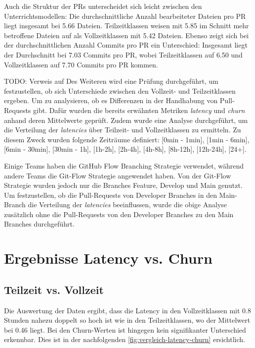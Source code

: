 Auch die Struktur der PRs unterscheidet sich leicht zwischen den Unterrichtsmodellen: Die durchschnittliche Anzahl bearbeiteter Dateien pro PR liegt insgesamt bei 5.66 Dateien. Teilzeitklassen weisen mit 5.85 im Schnitt mehr betroffene Dateien auf als Vollzeitklassen mit 5.42 Dateien. Ebenso zeigt sich bei der durchschnittlichen Anzahl Commits pro PR ein Unterschied: Insgesamt liegt der Durchschnitt bei 7.03 Commits pro PR, wobei Teilzeitklassen auf 6.50 und Vollzeitklassen auf 7.70 Commits pro PR kommen.

TODO: Verweis auf 
Des Weiteren wird eine Prüfung durchgeführt, um festzustellen, ob sich Unterschiede zwischen den Vollzeit- und Teilzeitklassen ergeben. Um zu analysieren, ob es Differenzen in der Handhabung von Pull-Requests gibt. Dafür wurden die bereits erwähnten Metriken \textit{latency} und \textit{churn} anhand deren Mittelwerte geprüft. Zudem wurde eine Analyse durchgeführt, um die Verteilung der \textit{latencies} über Teilzeit- und Vollzeitklassen zu ermitteln. Zu diesem Zweck wurden folgende Zeiträume definiert: [0min - 1min], [1min - 6min], [6min - 30min], [30min - 1h], [1h-2h], [2h-4h], [4h-8h], [8h-12h], [12h-24h], [24+].

Einige Teams haben die GitHub Flow Branching Strategie verwendet, während andere Teams die Git-Flow Strategie angewendet haben. Von der Git-Flow Strategie wurden jedoch nur die Branches Feature, Develop und Main genutzt. Um festzustellen, ob die Pull-Requests von Developer Branches in den Main-Branch die Verteilung der \textit{latencies} beeinflussen, wurde die obige Analyse zusätzlich ohne die Pull-Requests von den Developer Branches zu den Main Branches durchgeführt.


\section{Ergebnisse Latency vs. Churn}

\subsection{Teilzeit vs. Vollzeit}
Die Auswertung der Daten ergibt, dass die Latency in den Vollzeitklassen mit 0.8 Stunden nahezu doppelt so hoch ist wie in den Teilzeitklassen, wo der Mittelwert bei 0.46 liegt. Bei den Churn-Werten ist hingegen kein signifikanter Unterschied erkennbar. Dies ist in der nachfolgenden \autoref{fig:vergleich-latency-churn} ersichtlich.

